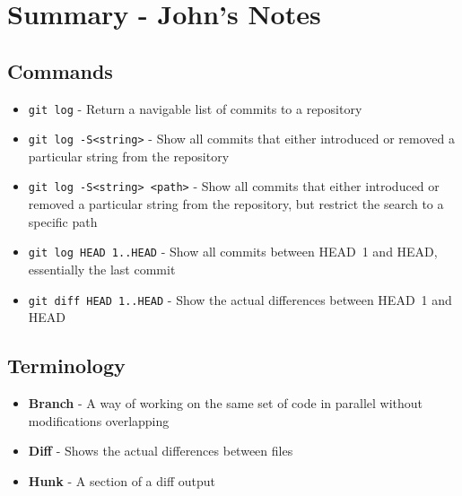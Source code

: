 
\clearpage

\section{Summary - John's Notes}
\subsection{Commands}
\begin{itemize}
\item\texttt{git log} - Return a navigable list of commits to a repository

\item\texttt{git log -S<string>} - Show all commits that either introduced or removed a particular string from the repository

\item\texttt{git log -S<string> <path>} - Show all commits that either introduced or removed a particular string from the repository, but restrict the search to a specific path

\item\texttt{git log HEAD~1..HEAD} - Show all commits between HEAD~1 and HEAD, essentially the last commit

\item\texttt{git diff HEAD~1..HEAD} - Show the actual differences between HEAD~1 and HEAD
\end{itemize}

\subsection{Terminology}
\begin{itemize}
\item\textbf{Branch} - A way of working on the same set of code in parallel without modifications overlapping

\item\textbf{Diff} - Shows the actual differences between files

\item\textbf{Hunk} - A section of a diff output
\end{itemize}



